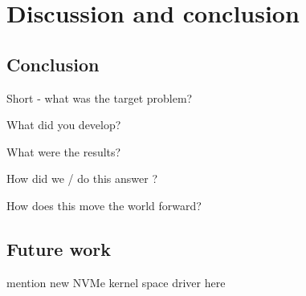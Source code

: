 \chapter{Discussion and conclusion}\label{chapter:conclusion}
\section{Conclusion}\label{sec:concl}

Short - what was the target problem?


What did you develop?

What were the results?

How did we / do this answer ?

How does this move the world forward?

\section{Future work}\label{sec:fw}
mention new NVMe kernel space driver here


